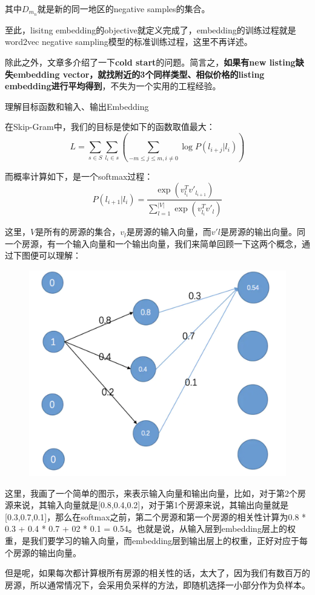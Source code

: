 \documentclass[12pt]{article}
\begin{document}
其中$D_{m_n}$就是新的同一地区的negative samples的集合。

至此，lisitng embedding的objective就定义完成了，embedding的训练过程就是word2vec negative sampling模型的标准训练过程，这里不再详述。

除此之外，文章多介绍了一下\textbf{cold start}的问题。简言之，\textbf{如果有new listing缺失embedding vector，就找附近的3个同样类型、相似价格的listing embedding进行平均得到}，不失为一个实用的工程经验。

\begin{framed}
理解目标函数和输入、输出Embedding\cite{Recommender_System_With_Deep_Learning_Airbnb}

在Skip-Gram中，我们的目标是使如下的函数取值最大：
$$
L = \sum_{s \in S}\sum_{l_i \in s}(\sum_{-m \le j \le m, i \neq 0}\log{P(l_{i+j}|l_i)})
$$

而概率计算如下，是一个softmax过程：
$$
P(l_{i+1}|l_i) = \frac{\exp(v^T_{l_i}v'_{l_{i+1}})}{\sum_{l=1}^{|V|}\exp(v^T_{l_i}v'_l)}
$$

这里，$V$是所有的房源的集合，$v_l$是房源的输入向量，而$v'l$是房源的输出向量。同一个房源，有一个输入向量和一个输出向量，我们来简单回顾一下这两个概念，通过下图便可以理解：
\begin{figure}[H]
    \centering
    \includegraphics[width=.6\textwidth]{fig/Embedding_House_Input_Output_Embedding_Example.png}
\end{figure}

这里，我画了一个简单的图示，来表示输入向量和输出向量，比如，对于第2个房源来说，其输入向量就是[0.8,0.4,0.2]，对于第1个房源来说，其输出向量就是[0.3,0.7,0.1]，那么在softmax之前，第二个房源和第一个房源的相关性计算为0.8 * 0.3 + 0.4 * 0.7 + 02 * 0.1 = 0.54。也就是说，从输入层到embedding层上的权重，是我们要学习的输入向量，而embedding层到输出层上的权重，正好对应于每个房源的输出向量。

但是呢，如果每次都计算根所有房源的相关性的话，太大了，因为我们有数百万的房源，所以通常情况下，会采用负采样的方法，即随机选择一小部分作为负样本。
\end{framed}
\end{document}

